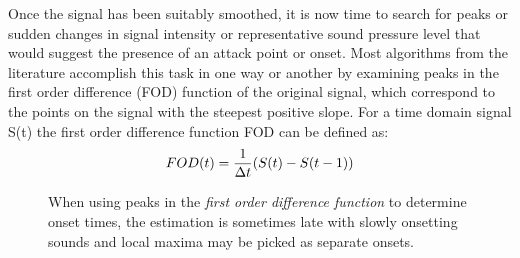 Once the signal has been suitably smoothed, it is now time to search
for peaks or sudden changes in signal intensity or representative
sound pressure level that would suggest the presence of an attack
point or onset.  Most algorithms from the literature accomplish this 
task in one way or another by examining peaks in the first order 
difference (FOD) function of the original signal, which correspond 
to the points on the signal with the steepest positive slope. For a 
time domain signal S(t) the first order difference function FOD can 
be defined as: 
\begin{equation}
FOD(t) = {1 \over \Delta t} (S(t) - S(t-1))
\label{FOD}
\end{equation}

\begin{figure}[thp]
  \begin{center}
    \label{A Slowly Onsetting Sound}
    \caption{When using peaks in the {\sl first order difference
        function} to determine onset times, the estimation is
      sometimes late with slowly onsetting sounds and local maxima may
      be picked as separate onsets.}
  \end{center}
\end{figure}

